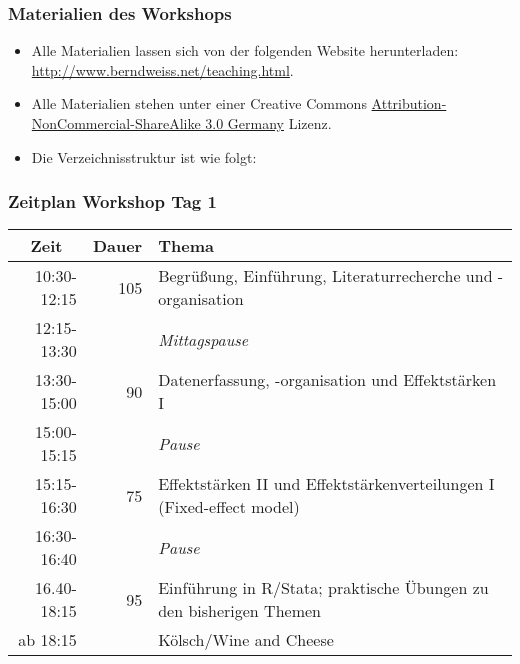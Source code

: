 \documentclass[%
handout%
]{beamer}\usepackage{graphicx, color}
\begin{document}
\begin{frame}
  \frametitle{Materialien des Workshops}
  \begin{itemize}
  \item Alle Materialien lassen sich von der folgenden Website herunterladen: \url{http://www.berndweiss.net/teaching.html}.
  \item Alle Materialien stehen unter einer Creative Commons
    \href{http://creativecommons.org/licenses/by-nc-sa/3.0/de/deed.en}{Attribution-NonCommercial-ShareAlike
      3.0 Germany} Lizenz.
  \item Die Verzeichnisstruktur ist wie folgt:
  \end{itemize}

\end{frame}


\begin{frame}[plain]
  \frametitle{Zeitplan Workshop Tag 1}
  \begin{center}
    \begin{tabularx}{\linewidth}{@{}rr>{\raggedright\arraybackslash}X@{}}
      \toprule
      \multicolumn{1}{c}{Zeit}  &  Dauer  &  Thema                                                                  \\
      \midrule
      10:30-12:15  &    105  &  Begrüßung, Einführung, Literaturrecherche und -organisation            \\
      12:15-13:30  &         &  \emph{Mittagspause}                                                    \\
      13:30-15:00  &     90  &  Datenerfassung, -organisation und Effektstärken I                      \\
      15:00-15:15  &         &  \emph{Pause}                                                           \\
      15:15-16:30  &     75  &  Effektstärken II und Effektstärkenverteilungen I (Fixed-effect model)  \\
      16:30-16:40  &         &  \emph{Pause}                                                           \\
      16.40-18:15  &     95  &  Einführung in R/Stata; praktische Übungen zu den bisherigen Themen     \\
      ab 18:15  &         &  Kölsch/Wine and Cheese                                                        \\
      \bottomrule
    \end{tabularx}
\end{center}
\end{frame}
\end{document}
